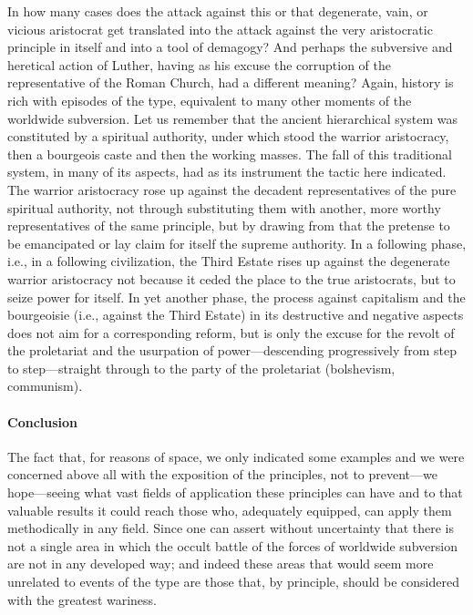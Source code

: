 In how many cases does the attack against this or that degenerate, vain, or vicious aristocrat get translated into the attack against the very aristocratic principle in itself and into a tool of demagogy? And perhaps the subversive and heretical action of Luther, having as his excuse the corruption of the representative of the Roman Church, had a different meaning? Again, history is rich with episodes of the type, equivalent to many other moments of the worldwide subversion. Let us remember that the ancient hierarchical system was constituted by a spiritual authority, under which stood the warrior aristocracy, then a bourgeois caste and then the working masses. The fall of this traditional system, in many of its aspects, had as its instrument the tactic here indicated. The warrior aristocracy rose up against the decadent representatives of the pure spiritual authority, not through substituting them with another, more worthy representatives of the same principle, but by drawing from that the pretense to be emancipated or lay claim for itself the supreme authority. In a following phase, i.e., in a following civilization, the Third Estate rises up against the degenerate warrior aristocracy not because it ceded the place to the true aristocrats, but to seize power for itself. In yet another phase, the process against capitalism and the bourgeoisie (i.e., against the Third Estate) in its destructive and negative aspects does not aim for a corresponding reform, but is only the excuse for the revolt of the proletariat and the usurpation of power---descending progressively from step to step---straight through to the party of the proletariat (bolshevism, communism).

\paragraph{Conclusion}


The fact that, for reasons of space, we only indicated some examples and we were concerned above all with the exposition of the principles, not to prevent---we hope---seeing what vast fields of application these principles can have and to that valuable results it could reach those who, adequately equipped, can apply them methodically in any field. Since one can assert without uncertainty that there is not a single area in which the occult battle of the forces of worldwide subversion are not in any developed way; and indeed these areas that would seem more unrelated to events of the type are those that, by principle, should be considered with the greatest wariness.

